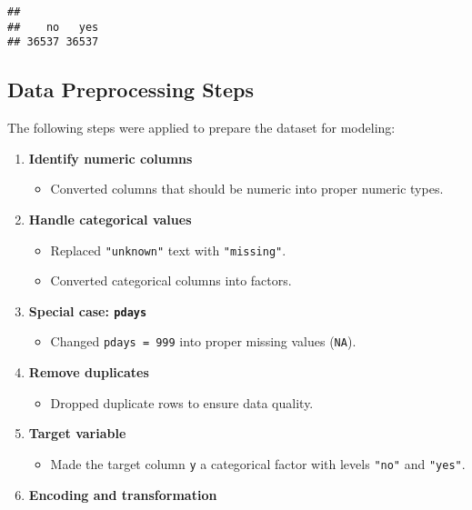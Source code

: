 \documentclass[
]{article}
\providecommand{\tightlist}{%
  \setlength{\itemsep}{0pt}\setlength{\parskip}{0pt}}
\begin{document}
\begin{verbatim}
## 
##    no   yes 
## 36537 36537
\end{verbatim}

\subsection{Data Preprocessing Steps}\label{data-preprocessing-steps}

The following steps were applied to prepare the dataset for modeling:

\begin{enumerate}
\def\labelenumi{\arabic{enumi}.}
\tightlist
\item
  \textbf{Identify numeric columns}

  \begin{itemize}
  \tightlist
  \item
    Converted columns that should be numeric into proper numeric types.
  \end{itemize}
\item
  \textbf{Handle categorical values}

  \begin{itemize}
  \tightlist
  \item
    Replaced \texttt{"unknown"} text with \texttt{"missing"}.\\
  \item
    Converted categorical columns into factors.
  \end{itemize}
\item
  \textbf{Special case: \texttt{pdays}}

  \begin{itemize}
  \tightlist
  \item
    Changed \texttt{pdays\ =\ 999} into proper missing values
    (\texttt{NA}).
  \end{itemize}
\item
  \textbf{Remove duplicates}

  \begin{itemize}
  \tightlist
  \item
    Dropped duplicate rows to ensure data quality.
  \end{itemize}
\item
  \textbf{Target variable}

  \begin{itemize}
  \tightlist
  \item
    Made the target column \texttt{y} a categorical factor with levels
    \texttt{"no"} and \texttt{"yes"}.
  \end{itemize}
\item
  \textbf{Encoding and transformation}


\end{enumerate}
\end{document}
